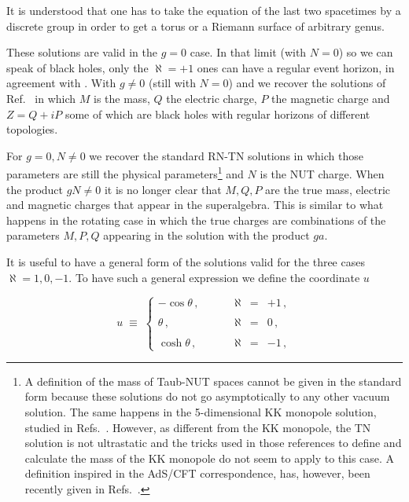 \documentclass[12pt,a4paper]{article}
\begin{document}
It is understood that one has to take the equation of the last two
spacetimes by a discrete group in order to get a torus or a Riemann
surface of arbitrary genus.

These solutions are valid in the $g=0$ case. In that limit (with $N=0$)
so we can speak of black holes, only the $\aleph=+1$ ones can have a
regular event horizon, in agreement with \cite{art:Haw7,art:FSW}.
With $g\neq 0$ (still with $N=0$) and we recover the solutions of
Ref.~\cite{art:BLP} in which $M$ is the mass, $Q$ the electric charge,
$P$ the magnetic charge and $Z=Q+iP$ some of which are black holes
with regular horizons of different topologies.

For $g=0,N\neq 0$ we recover the standard RN-TN solutions in which
those parameters are still the physical parameters\footnote{A
  definition of the mass of Taub-NUT spaces cannot be given in the
  standard form because these solutions do not go asymptotically to
  any other vacuum solution.  The same happens in the 5-dimensional KK
  monopole solution, studied in Refs.~\cite{kn:DS,kn:BKKLS}. However,
  as different from the KK monopole, the TN solution is not
  ultrastatic and the tricks used in those references to define and
  calculate the mass of the KK monopole do not seem to apply to this
  case. A definition inspired in the AdS/CFT correspondence, has,
  however, been recently given in Refs.~\cite{kn:Man3,kn:CEJM}.} and
$N$ is the NUT charge. When the product $gN\neq 0$ it is no longer
clear that $M,Q,P$ are the true mass, electric and magnetic charges
that appear in the superalgebra.  This is similar to what happens in
the rotating case \cite{art:KP} in which the true charges are
combinations of the parameters $M,P,Q$ appearing in the solution with
the product $ga$.

It is useful to have a general form of the solutions valid for the
three cases $\aleph=1,0,-1$. To have such a general expression we
define the coordinate $u$

\begin{equation}
 u \;\equiv\; 
\left\{
\begin{array}{lrcl}
-\cos{\theta}\, ,\hspace{1cm} & \aleph & = &  +1\, , \\
& & & \\
\theta\, , & \aleph & = & 0\, , \\
& & & \\
\cosh{\theta}\, ,  & \aleph & = & -1\, , 
\end{array}
\right.
\end{equation}
\end{document}
